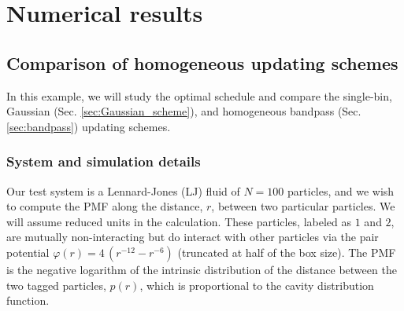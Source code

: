 \documentclass[reprint, superscriptaddress, floatfix]{revtex4-1}
\begin{document}
\section{\label{sec:results}
Numerical results}



\subsection{\label{sec:lj}
Comparison of homogeneous updating schemes}

In this example, we will study the optimal schedule
and compare the single-bin,
Gaussian (Sec. \ref{sec:Gaussian_scheme}),
and homogeneous bandpass (Sec. \ref{sec:bandpass})
updating schemes.

\subsubsection{System and simulation details}

Our test system is
a Lennard-Jones (LJ) fluid of $N = 100$ particles,
and we wish to compute the PMF along
the distance, $r$, between two particular particles.
%
We will assume reduced units in the calculation.
%
These particles, labeled as $1$ and $2$,
are mutually non-interacting
but do interact with other particles
via the pair potential $\varphi(r) = 4 \, \left(r^{-12} - r^{-6}\right)$
(truncated at half of the box size).
%
The PMF is the negative logarithm of
the intrinsic distribution of the distance
between the two tagged particles, $p(r)$,
which is proportional to the cavity distribution function\cite{hansen}.
%
\end{document}
